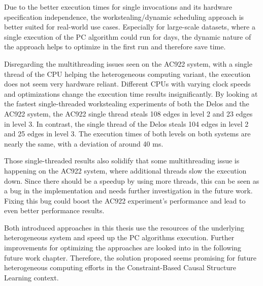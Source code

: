 Due to the better execution times for single invocations and its hardware specification independence, the workstealing/dynamic scheduling approach is better suited for real-world use cases. Especially for large-scale datasets, where a single execution of the PC algorithm could run for days, the dynamic nature of the approach helps to optimize in the first run and therefore save time.

Disregarding the multithreading issues seen on the AC922 system, with a single thread of the CPU helping the heterogeneous computing variant, the execution does not seem very hardware reliant. Different CPUs with varying clock speeds and optimizations change the execution time results insignificantly. By looking at the fastest single-threaded workstealing experiments of both the Delos and the AC922 system, the AC922 single thread steals 108 edges in level 2 and 23 edges in level 3. In contrast, the single thread of the Delos steals 104 edges in level 2 and 25 edges in level 3. The execution times of both levels on both systems are nearly the same, with a deviation of around 40 ms.

Those single-threaded results also solidify that some multithreading issue is happening on the AC922 system, where additional threads slow the execution down. Since there should be a speedup by using more threads, this can be seen as a bug in the implementation and needs further investigation in the future work. Fixing this bug could boost the AC922 experiment's performance and lead to even better performance results.

Both introduced approaches in this thesis use the resources of the underlying heterogeneous system and speed up the PC algorithms execution. Further improvements for optimizing the approaches are looked into in the following future work chapter. Therefore, the solution proposed seems promising for future heterogeneous computing efforts in the Constraint-Based Causal Structure Learning context.
% 
% 
% 
% 
% 
% 